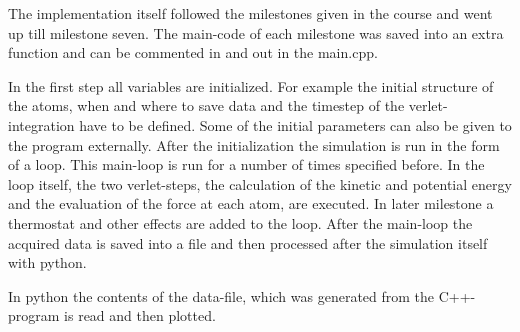 The implementation itself followed the milestones given in the course and went up till milestone seven. 
The main-code of each milestone was saved into an extra function and can be commented in and out in the main.cpp.


\par 
In the first step all variables are initialized. For example the initial structure of the atoms, when and where to save data and the timestep of the verlet-integration have to be defined. Some of the initial parameters can also be given to the program externally. After the initialization the simulation is run in the form of a loop. This main-loop is run for a number of times specified before. In the loop itself, the two verlet-steps, the calculation of the kinetic and potential energy and the evaluation of the force at each atom, are executed. In later milestone a thermostat and other effects are added to the loop. 
After the main-loop the acquired data is saved into a file and then processed after the simulation itself with python. 
\par 
In python the contents of the data-file, which was generated from the C++-program is read and then plotted. 




